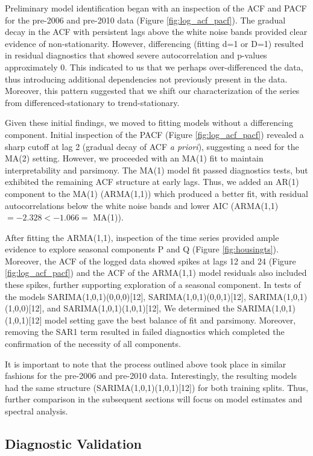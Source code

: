 \documentclass[10pt,twocolumn,letterpaper]{article}
\begin{document}
Preliminary model identification began with an inspection of the ACF and PACF for the pre-2006 and pre-2010 data (Figure \ref{fig:log_acf_pacf}). The gradual decay in the ACF with persistent lags above the white noise bands provided clear evidence of non-stationarity. However, differencing (fitting d=1 or D=1) resulted in residual diagnostics that showed severe autocorrelation and p-values approximately 0. This indicated to us that we perhaps over-differenced the data, thus introducing additional dependencies not previously present in the data. Moreover, this pattern suggested that we shift our characterization of the series from differenced-stationary to trend-stationary. 

Given these initial findings, we moved to fitting models without a differencing component. Initial inspection of the PACF (Figure \ref{fig:log_acf_pacf}) revealed a sharp cutoff at lag 2 (gradual decay of ACF \textit{a priori}), suggesting a need for the MA(2) setting. However, we proceeded with an MA(1) fit to maintain interpretability and parsimony. The MA(1) model fit passed diagnostics tests, but exhibited the remaining ACF structure at early lags. Thus, we added an AR(1) component to the MA(1) (ARMA(1,1)) which produced a better fit, with residual autocorrelations below the white noise bands and lower AIC (ARMA(1,1) $= -2.328 < -1.066 =$ MA(1)). 

After fitting the ARMA(1,1), inspection of the time series provided ample evidence to explore seasonal components P and Q (Figure \ref{fig:housingts}). Moreover, the ACF of the logged data showed spikes at lags 12 and 24 (Figure \ref{fig:log_acf_pacf}) and the ACF of the ARMA(1,1) model residuals also included these spikes, further supporting exploration of a seasonal component. In tests of the models SARIMA(1,0,1)(0,0,0)[12], SARIMA(1,0,1)(0,0,1)[12], SARIMA(1,0,1)(1,0,0)[12], and SARIMA(1,0,1)(1,0,1)[12], We determined the SARIMA(1,0,1)(1,0,1)[12] model setting gave the best balance of fit and parsimony. Moreover, removing the SAR1 term resulted in failed diagnostics which completed the confirmation of the necessity of all components.

It is important to note that the process outlined above took place in similar fashions for the pre-2006 and pre-2010 data. Interestingly, the resulting models had the same structure (SARIMA(1,0,1)(1,0,1)[12]) for both training splits. Thus, further comparison in the subsequent sections will focus on model estimates and spectral analysis.

\subsection{Diagnostic Validation}
\end{document}
